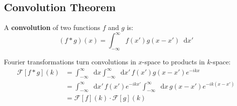 \documentclass{article}
\newcommand{\diff}{\mathop{}\!\mathrm{d}}
\theoremstyle{definition}
\begin{document}
\subsection{Convolution Theorem}
A \textbf{convolution} of two functions $f$ and $g$ is:
\begin{equation*}
	(f * g)(x) = \int_{-\infty}^\infty f(x') g(x-x') \diff x'
\end{equation*}

Fourier transformations turn convolutions in $x$-space to products in $k$-space:
\begin{equation*}
\begin{split}
	\mathcal{F}[f * g](k)
		&= \int_{-\infty}^\infty \diff x \int_{-\infty}^\infty \diff x' \, f(x')g(x-x') e^{-ikx} \\
		&= \int_{-\infty}^\infty \diff x' \, f(x')e^{-ikx'} \int_{-\infty}^\infty \diff x \, g(x-x') e^{-ik(x-x')} \\
		&= \mathcal{F}[f](k) \cdot \mathcal{F}[g](k) \\
\end{split}
\end{equation*}
\end{document}
